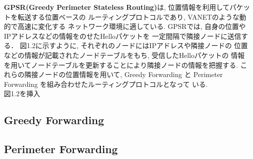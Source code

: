 \textbf{GPSR(Greedy Perimeter Stateless Routing)}\cite{gpsr}は, 
位置情報を利用してパケットを転送する位置ベースの
ルーティングプロトコルであり, VANETのような動的で高速に変化する
ネットワーク環境に適している.
GPSRでは, 自身の位置やIPアドレスなどの情報をのせたHelloパケットを
一定間隔で隣接ノードに送信する．
図1.2に示すように, それぞれのノードにはIPアドレスや隣接ノードの
位置などの情報が記載されたノードテーブルをもち, 受信したHelloパケットの
情報を用いてノードテーブルを更新することにより隣接ノードの情報を把握する. 
これらの隣接ノードの位置情報を用いて, Greedy Forwarding と 
Perimeter Forwarding を組み合わせたルーティングプロトコルとなって
いる.\\

{\Huge 図1.2を挿入}

\subsection{Greedy Forwarding}

\subsection{Perimeter Forwarding}
